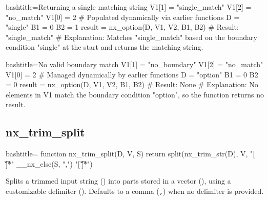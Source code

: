 \begin{NexCodeBox}{bash}{title={Returning a single matching string}}
	V1[1] = "single_match"
	V1[2] = "no_match"
	V1[0] = 2 # Populated dynamically via earlier functions
	D = "single"
	B1 = 0
	B2 = 1
	result = nx_option(D, V1, V2, B1, B2)
	# Result: "single_match"
	# Explanation: Matches "single_match" based on the boundary condition "single" at the start and returns the matching string.
\end{NexCodeBox}

\begin{NexCodeBox}{bash}{title={No valid boundary match}}
	V1[1] = "no_boundary"
	V1[2] = "no_match"
	V1[0] = 2 # Managed dynamically by earlier functions
	D = "option"
	B1 = 0
	B2 = 0
	result = nx_option(D, V1, V2, B1, B2)
	# Result: None
	# Explanation: No elements in V1 match the boundary condition "option", so the function returns no result.
\end{NexCodeBox}

\newpage
\subsection{nx_trim_split}
\label{nx_trim_split}
\begin{NexCodeBox}{bash}{title={}}
	function nx_trim_split(D, V, S) {
		return split(nx_trim_str(D), V, "[ \v\t\n\f]*" __nx_else(S, ",") "[ \v\t\n\f]*")
	}
\end{NexCodeBox}

\begin{NexMainBox}
	\begin{NexMainBox}
		Splits a trimmed input string () into parts stored in a vector (), using a customizable delimiter (). Defaults to a comma (\texttt{,}) when no delimiter is provided.
	\end{NexMainBox}
	\begin{NexMainBox}
		\begin{NexListDark}
		\end{NexListDark}
	\end{NexMainBox}
\end{NexMainBox}

